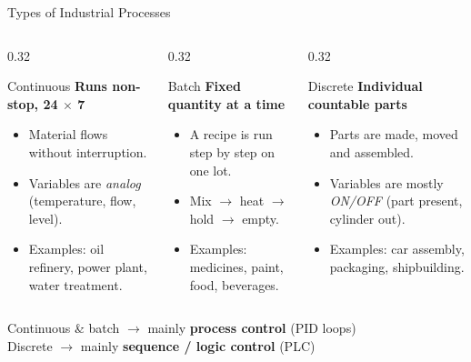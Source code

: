 \documentclass[aspectratio=169]{beamer}
\begin{document}
	\begin{frame}{Types of Industrial Processes}
		\begin{columns}[T]
			\begin{column}{0.32\textwidth}
				\begin{block}{Continuous}
					\centering
					\textbf{Runs non-stop, 24 $\times$ 7}

					\vspace{0.2cm}

					\begin{itemize}\small
						\item Material flows without interruption.
						\item Variables are \emph{analog} (temperature, flow, level).
						\item Examples: oil refinery, power plant, water treatment.
					\end{itemize}
				\end{block}
			\end{column}
			\begin{column}{0.32\textwidth}
				\begin{block}{Batch}
					\centering
					\textbf{Fixed quantity at a time}

					\vspace{0.2cm}

					\begin{itemize}\small
						\item A recipe is run step by step on one lot.
						\item Mix $\rightarrow$ heat $\rightarrow$ hold $\rightarrow$ empty.
						\item Examples: medicines, paint, food, beverages.
					\end{itemize}
				\end{block}
			\end{column}
			\begin{column}{0.32\textwidth}
				\begin{block}{Discrete}
					\centering
					\textbf{Individual countable parts}

					\vspace{0.2cm}

					\begin{itemize}\small
						\item Parts are made, moved and assembled.
						\item Variables are mostly \emph{ON/OFF} (part present, cylinder out).
						\item Examples: car assembly, packaging, shipbuilding.
					\end{itemize}
				\end{block}
			\end{column}
		\end{columns}
		\vspace{0.35cm}
		\begin{center}
			\small
			Continuous \& batch $\rightarrow$ mainly \textbf{process control} (PID loops)\\
			Discrete $\rightarrow$ mainly \textbf{sequence / logic control} (PLC)
		\end{center}
	\end{frame}
\end{document}
